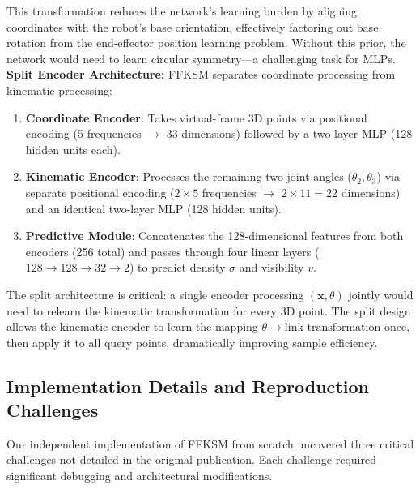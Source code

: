 \documentclass[12pt,a4paper,oneside]{report}
\begin{document}
This transformation reduces the network's learning burden by aligning coordinates with the robot's base orientation, effectively factoring out base rotation from the end-effector position learning problem. Without this prior, the network would need to learn circular symmetry---a challenging task for MLPs.
\textbf{Split Encoder Architecture:} FFKSM separates coordinate processing from kinematic processing:
\begin{enumerate}
    \item \textbf{Coordinate Encoder}: Takes virtual-frame 3D points via positional encoding (5 frequencies $\rightarrow$ 33 dimensions) followed by a two-layer MLP (128 hidden units each).
    \item \textbf{Kinematic Encoder}: Processes the remaining two joint angles ($\theta_2, \theta_3$) via separate positional encoding ($2 \times 5$ frequencies $\rightarrow$ $2 \times 11 = 22$ dimensions) and an identical two-layer MLP (128 hidden units).
    \item \textbf{Predictive Module}: Concatenates the 128-dimensional features from both encoders (256 total) and passes through four linear layers ($128 \rightarrow 128 \rightarrow 32 \rightarrow 2$) to predict density $\sigma$ and visibility $v$.
\end{enumerate}

The split architecture is critical: a single encoder processing $(\mathbf{x}, \theta)$ jointly would need to relearn the kinematic transformation for every 3D point. The split design allows the kinematic encoder to learn the mapping $\theta \rightarrow \text{link transformation}$ once, then apply it to all query points, dramatically improving sample efficiency.
\subsection{Implementation Details and Reproduction Challenges}
\label{subsec:implementation_details_and_reproduction_challenges}

Our independent implementation of FFKSM from scratch uncovered three critical challenges not detailed in the original publication. Each challenge required significant debugging and architectural modifications.
\end{document}
